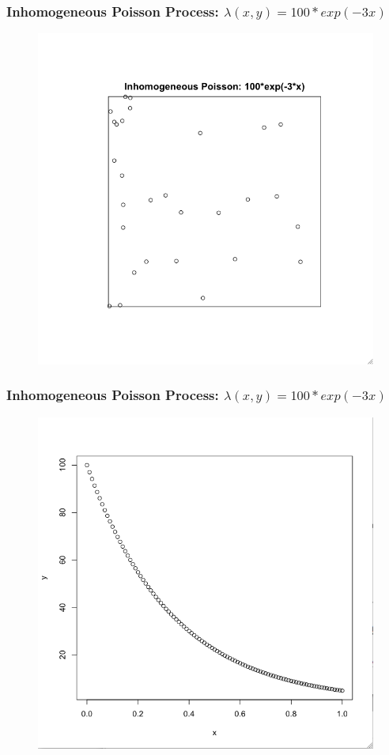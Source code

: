 \documentclass[nototal,handout]{beamer}
\begin{document}
\begin{frame}
  \frametitle{Inhomogeneous Poisson Process: $\lambda(x,y)=100*exp(-3x)$}
 \begin{figure}[ht]
  \centering
  \includegraphics[scale=0.30]{ihpne.png}
  \end{figure}
 \end{frame} 

\begin{frame}
  \frametitle{Inhomogeneous Poisson Process: $\lambda(x,y)=100*exp(-3x)$}
 \begin{figure}[ht]
  \centering
  \includegraphics[scale=0.30]{ihpnef.png}
  \end{figure}
 \end{frame} 
\end{document}
